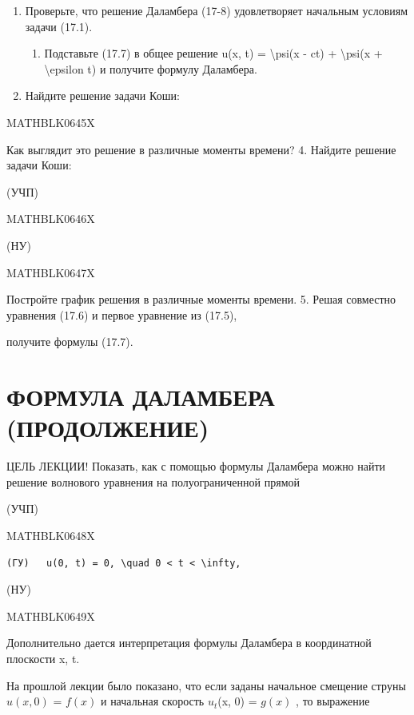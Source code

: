 \documentclass[
]{article}
\providecommand{\tightlist}{%
  \setlength{\itemsep}{0pt}\setlength{\parskip}{0pt}}
\begin{document}
{{\begin{enumerate}
\def\labelenumi{\arabic{enumi}.}
\item
  Проверьте, что решение Даламбера (17-8) удовлетворяет начальным
  условиям задачи (17.1).

  \begin{enumerate}
  \def\labelenumii{\arabic{enumii}.}
  \setcounter{enumii}{1}
  \tightlist
  \item
    Подставьте (17.7) в общее решение u(x, t) = \textbackslash psi(x -
    ct) + \textbackslash psi(x + \textbackslash epsilon t) и получите
    формулу Даламбера.
  \end{enumerate}
\item
  Найдите решение задачи Коши:
\end{enumerate}

MATHBLK0645X

Как выглядит это решение в различные моменты времени? 4. Найдите решение
задачи Коши:

(УЧП)

MATHBLK0646X

(НУ)

MATHBLK0647X

Постройте график решения в различные моменты времени. 5. Решая совместно
уравнения (17.6) и первое уравнение из (17.5),

получите формулы (17.7).

\section{ФОРМУЛА ДАЛАМБЕРА
(ПРОДОЛЖЕНИЕ)}\label{ux444ux43eux440ux43cux443ux43bux430-ux434ux430ux43bux430ux43cux431ux435ux440ux430-ux43fux440ux43eux434ux43eux43bux436ux435ux43dux438ux435}

ЦЕЛЬ ЛЕКЦИИ! Показать, как с помощью формулы Даламбера можно найти
решение волнового уравнения на полуограниченной прямой

(УЧП)

MATHBLK0648X

\begin{verbatim}
(ГУ)   u(0, t) = 0, \quad 0 < t < \infty, 
\end{verbatim}

(НУ)

MATHBLK0649X

Дополнительно дается интерпретация формулы Даламбера в координатной
плоскости x, t.

На прошлой лекции было показано, что если заданы начальное смещение
струны \(u(x, 0)\) = \(f(x)\) и начальная скорость \(u_t\)(x, 0) =
\(g(x)\) , то выражение

}}
\end{document}
